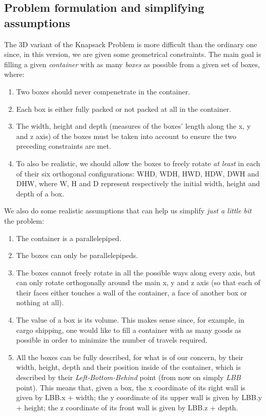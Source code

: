 \documentclass[12pt]{extarticle}
\begin{document}
\subsection{Problem formulation and simplifying assumptions}
The 3D variant of the Knapsack Problem is more difficult than the ordinary one since, in this version, we are given some geometrical constraints. The main goal is filling a given \emph{container} with as many \emph{boxes} as possible from a given set of boxes, where:
\begin{enumerate}
    \item Two boxes should never compenetrate in the container.
    \item Each box is either fully packed or not packed at all in the container.
    \item The width, height and depth (measures of the boxes' length along the x, y and z axis) of the boxes must be taken into account to ensure the two preceding constraints are met.
    \item To also be realistic, we should allow the boxes to freely rotate \emph{at least} in each of their six orthogonal configurations: WHD, WDH, HWD, HDW, DWH and DHW, where W, H and D represent respectively the initial width, height and depth of a box.
\end{enumerate}
We also do some realistic assumptions that can help us simplify \emph{just a little bit} the problem:
\begin{enumerate}
    \item The container is a parallelepiped.
    \item The boxes can only be parallelepipeds.
    \item The boxes cannot freely rotate in all the possible ways along every axis, but can only rotate orthogonally around the main x, y and z axis (so that each of their faces either touches a wall of the container, a face of another box or nothing at all).
    \item The value of a box is its volume. This makes sense since, for example, in cargo shipping, one would like to fill a container with as many goods as possible in order to minimize the number of travels required.
    \item All the boxes can be fully described, for what is of our concern, by their width, height, depth and their position inside of the container, which is described by their \emph{Left-Bottom-Behind} point (from now on simply \emph{LBB} point). This means that, given a box, the x coordinate of its right wall is given by LBB.x + width; the y coordinate of its upper wall is given by LBB.y + height; the z coordinate of its front wall is given by LBB.z + depth.
\end{enumerate}
\end{document}
